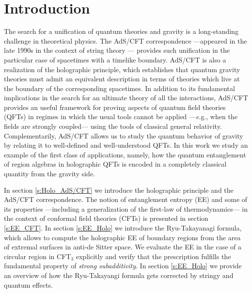 \documentclass[twocolumn]{revtex4-2}
\begin{document}
\section{Introduction} \label{s:Intro}
The search for a unification of quantum theories and gravity is a long-standing challenge in theoretical physics. The AdS/CFT correspondence ---appeared in the late 1990s in the context of string theory \cite{maldacena_large_1999}--- provides such unification in the particular case of spacetimes with a timelike boundary. AdS/CFT is also a realization of the holographic principle, which establishes that quantum gravity theories must admit an equivalent description in terms of theories which live at the boundary of the corresponding spacetimes.  %
In addition to its fundamental implications in the search for an ultimate theory of all the interactions, AdS/CFT provides an useful framework for proving aspects of quantum field theories (QFTs) in regimes in which the usual tools cannot be applied ---{\emph e.g.,} when the fields are strongly coupled--- using the tools of classical general relativity. %
Complementarily, AdS/CFT allows us to study the quantum behavior of gravity by relating it to well-defined and well-understood QFTs.
In this work we study an example of the first class of applications, namely, how the quantum entanglement of region algebras in holographic QFTs is encoded in a completely classical quantity from the gravity side.


In section \ref{s:Holo_AdS/CFT} we introduce the holographic principle and the AdS/CFT correspondence. The notion of entanglement entropy (EE) and some of its properties ---including a generalization of the first-law of thermodynamics--- in the context of conformal field theories (CFTs) is presented in section \ref{s:EE_CFT}. In section \ref{s:EE_Holo} we introduce the Ryu-Takayanagi formula, which allows to compute the holographic EE of boundary regions from the area of extremal surfaces in anti-de Sitter space. We evaluate the EE in the case of a circular region in CFT$_3$ explicitly and verify that the prescription fulfills the fundamental property of {\it strong subadditivity}. In section \ref{s:EE_Holo} we provide an overview of how the Ryu-Takayangi formula gets corrected by stringy and quantum effects. 
\end{document}
